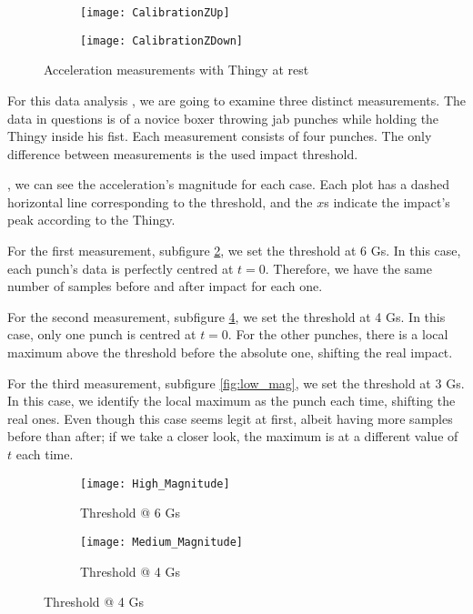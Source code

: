 \begin{figure}[hbt!]\ContinuedFloat
	\centering
	\begin{subfigure}{0.48\linewidth}
		\centering
		\texttt{[image: CalibrationZUp]}
	\end{subfigure}
	\begin{subfigure}{0.48\linewidth}
		\centering
		\texttt{[image: CalibrationZDown]}
	\end{subfigure}
	\caption{Acceleration measurements with Thingy at rest}
	\label{fig:acc_cal}
\end{figure}

For this data analysis , we are going to examine three distinct measurements. The data in questions is of a novice boxer throwing jab punches while holding the Thingy inside his fist. Each measurement consists of four punches. The only difference between measurements is the used impact threshold.

, we can see the acceleration's magnitude for each case. Each plot has a dashed horizontal line corresponding to the threshold, and the $x$s indicate the impact's peak according to the Thingy. 

For the first measurement, subfigure \ref{fig:high_mag}, we set the threshold at 6 Gs. In this case, each punch's data is perfectly centred at $t = 0$. Therefore, we have the same number of samples before and after impact for each one.

For the second measurement, subfigure \ref{fig:medium_mag}, we set the threshold at 4 Gs. In this case, only one punch is centred at $t = 0$. For the other punches, there is a local maximum above the threshold before the absolute one, shifting the real impact.

For the third measurement, subfigure \ref{fig:low_mag}, we set the threshold at 3 Gs. In this case, we identify the local maximum as the punch each time, shifting the real ones. Even though this case seems legit at first, albeit having more samples before than after; if we take a closer look, the maximum is at a different value of $t$ each time.
\begin{figure}[hbt!]
	\centering
	\begin{subfigure}{0.9\linewidth}
		\centering
		\texttt{[image: High\_Magnitude]}
		\caption{Threshold @ 6 Gs}
		\label{fig:high_mag}
	\end{subfigure}
	\begin{subfigure}{0.9\linewidth}
		\centering
		\texttt{[image: Medium\_Magnitude]}
		\caption{Threshold @ 4 Gs}
		\label{fig:medium_mag}
	\end{subfigure}
\end{figure}

